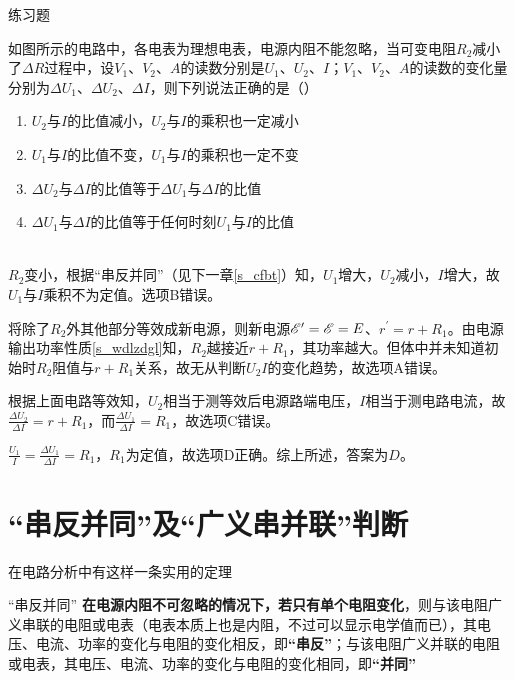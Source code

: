 \begin{ep}{练习题}{}



如图所示的电路中，各电表为理想电表，电源内阻不能忽略，当可变电阻$R_2$减小了$\Delta R$过程中，设$V_1$、$V_2$、$A$的读数分别是$U_1$、$U_2$、$I$；$V_1$、$V_2$、$A$的读数的变化量分别为$\Delta U_1$、$\Delta U_2$、$\Delta I$，则下列说法正确的是（）

\begin{enumerate}[label=(\Alph*)]
  \item $U_2$与$I$的比值减小，$U_2$与$I$的乘积也一定减小
  \item $U_1$与$I$的比值不变，$U_1$与$I$的乘积也一定不变
  \item $\Delta U_2$与$\Delta I$的比值等于$\Delta U_1$与$\Delta I$的比值
  \item $\Delta U_1$与$\Delta I$的比值等于任何时刻$U_1$与$I$的比值
\end{enumerate}

~\\
$R_2$变小，根据“串反并同”（见下一章\eqref{s_cfbt}）知，$U_1$增大，$U_2$减小，$I$增大，故$U_1$与$I$乘积不为定值。选项B错误。

将除了$R_2$外其他部分等效成新电源，则新电源$\mathscr{E}^{\prime} = \mathscr{E} = E$、$r^{\prime} = r + R_1$。由电源输出功率性质\eqref{s_wdlzdgl}知，$R_2$越接近$r + R_1$，其功率越大。但体中并未知道初始时$R_2$阻值与$r + R_1$关系，故无从判断$U_2 I$的变化趋势，故选项A错误。

根据上面电路等效知，$U_2$相当于测等效后电源路端电压，$I$相当于测电路电流，故$\frac{\Delta U_2}{\Delta I} = r + R_1$，而$\frac{\Delta U_1}{\Delta I} = R_1$，故选项C错误。

$\frac{U_1}{I} = \frac{\Delta U_1}{\Delta I} = R_1$，$R_1$为定值，故选项D正确。综上所述，答案为$D$。
\end{ep}

\section{“串反并同”及“广义串并联”判断}
\label{s_cfbt}

在电路分析中有这样一条实用的定理

\begin{theo}{“串反并同”}{}
\textbf{在电源内阻不可忽略的情况下，若只有单个电阻变化}，则与该电阻广义串联的电阻或电表（电表本质上也是内阻，不过可以显示电学值而已），其电压、电流、功率的变化与电阻的变化相反，即\textbf{“串反”}；与该电阻广义并联的电阻或电表，其电压、电流、功率的变化与电阻的变化相同，即\textbf{“并同”}
\end{theo}

